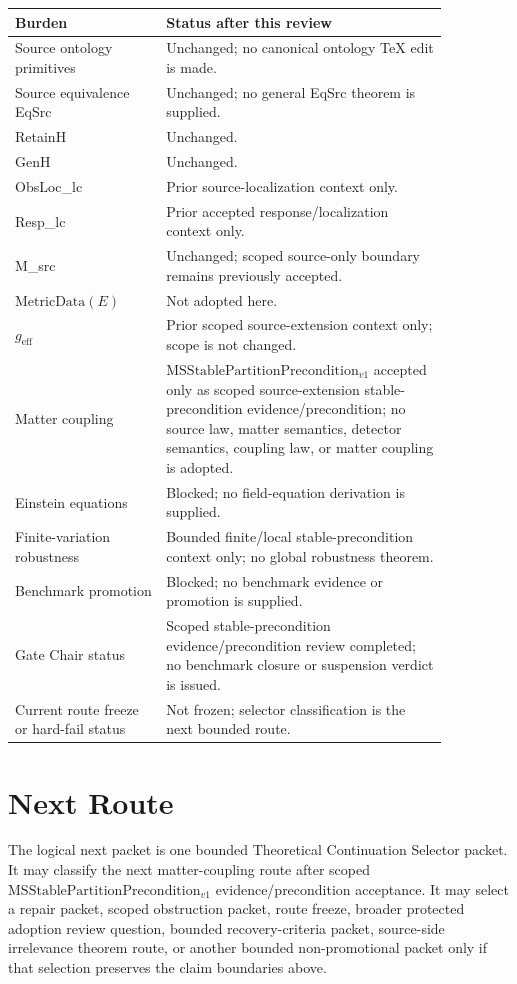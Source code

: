 \documentclass[11pt]{article}
\newcommand{\MSStablePre}{\mathrm{MSStablePartitionPrecondition}_{v1}}
\newcommand{\MetricData}{\mathrm{MetricData}}
\newcommand{\geff}{g_{\mathrm{eff}}}
\begin{document}
\begin{longtable}{p{0.30\linewidth}p{0.56\linewidth}}
\toprule
Burden & Status after this review \\
\midrule
Source ontology primitives & Unchanged; no canonical ontology TeX edit is made. \\
Source equivalence EqSrc & Unchanged; no general EqSrc theorem is supplied. \\
RetainH & Unchanged. \\
GenH & Unchanged. \\
ObsLoc\_lc & Prior source-localization context only. \\
Resp\_lc & Prior accepted response/localization context only. \\
M\_src & Unchanged; scoped source-only boundary remains previously accepted. \\
\(\MetricData(E)\) & Not adopted here. \\
\(\geff\) & Prior scoped source-extension context only; scope is not changed. \\
Matter coupling & \(\MSStablePre\) accepted only as scoped source-extension stable-precondition evidence/precondition; no source law, matter semantics, detector semantics, coupling law, or matter coupling is adopted. \\
Einstein equations & Blocked; no field-equation derivation is supplied. \\
Finite-variation robustness & Bounded finite/local stable-precondition context only; no global robustness theorem. \\
Benchmark promotion & Blocked; no benchmark evidence or promotion is supplied. \\
Gate Chair status & Scoped stable-precondition evidence/precondition review completed; no benchmark closure or suspension verdict is issued. \\
Current route freeze or hard-fail status & Not frozen; selector classification is the next bounded route. \\
\bottomrule
\end{longtable}

\section{Next Route}

The logical next packet is one bounded Theoretical Continuation Selector
packet. It may classify the next matter-coupling route after scoped
\(\MSStablePre\) evidence/precondition acceptance. It may select a repair
packet, scoped obstruction packet, route freeze, broader protected adoption
review question, bounded recovery-criteria packet, source-side irrelevance
theorem route, or another bounded non-promotional packet only if that
selection preserves the claim boundaries above.
\end{document}
